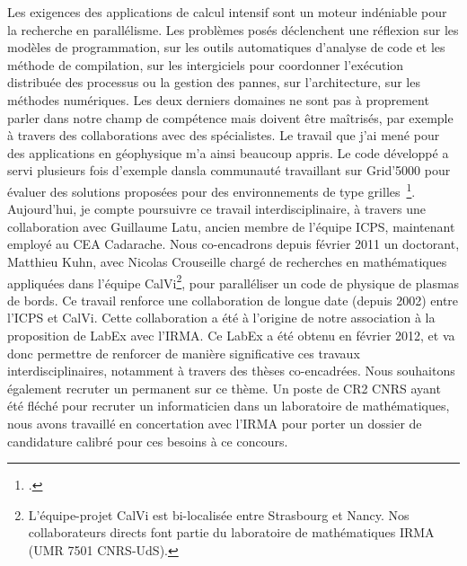 \documentclass[11pt]{article}
\begin{document}
Les exigences des applications de calcul intensif sont un moteur indéniable
pour la recherche en parallélisme. Les problèmes posés déclenchent une 
réflexion sur les modèles de programmation, sur les outils automatiques
d'analyse de code et les méthode de compilation, sur les intergiciels 
pour coordonner l'exécution distribuée des processus ou la gestion des pannes, 
sur l'architecture, sur les méthodes numériques. Les deux derniers domaines ne
 sont pas à proprement parler dans notre champ de compétence mais doivent
être maîtrisés, par exemple à travers des collaborations avec des 
spécialistes. Le travail que j'ai mené pour des applications en géophysique 
m'a ainsi beaucoup appris. Le code développé a servi plusieurs fois d'exemple 
dansla communauté travaillant sur Grid'5000 pour évaluer des solutions proposées
pour des environnements de type grilles~\footcite{Cappello07}.  \\

Aujourd'hui, je compte poursuivre ce travail interdisciplinaire, à travers 
une collaboration avec Guillaume Latu, ancien membre de l'équipe ICPS, 
maintenant employé au CEA Cadarache. Nous co-encadrons depuis février 2011 un 
doctorant, Matthieu Kuhn, avec Nicolas Crouseille chargé de recherches en 
mathématiques appliquées dans l'équipe CalVi\footnote{L'équipe-projet CalVi
est bi-localisée entre Strasbourg et Nancy.  Nos collaborateurs directs font 
partie du laboratoire de mathématiques IRMA (UMR 7501 CNRS-UdS).}, pour 
paralléliser un code de physique de plasmas de bords. Ce travail renforce une 
collaboration de longue date (depuis 2002) entre l'ICPS et CalVi. Cette 
collaboration a été à l'origine de notre association à la proposition de LabEx 
avec l'IRMA. Ce LabEx a été obtenu en février 2012, et va donc permettre de 
renforcer de manière significative ces travaux interdisciplinaires, notamment 
à travers des thèses co-encadrées. Nous souhaitons également recruter un 
permanent sur ce thème. Un poste de CR2 CNRS ayant été fléché pour recruter
un informaticien dans un laboratoire de mathématiques, nous avons travaillé
en concertation avec l'IRMA pour porter un dossier de candidature calibré 
pour ces besoins à ce concours.\\  

\end{document}
